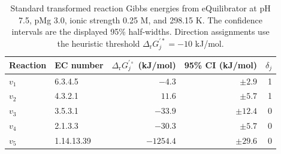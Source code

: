 \begin{table}[htbp]
  \centering
  \caption{Standard transformed reaction Gibbs energies from eQuilibrator at
    pH 7.5, pMg 3.0, ionic strength 0.25 M, and 298.15 K. The confidence
    intervals are the displayed 95\% half-widths. Direction assignments use
    the heuristic threshold
    $\Delta_{\mathrm r}G_j^{\prime *}=-10$ kJ/mol.}
  \label{tab:urea-thermodynamics}
  \begin{tabular}{llrrr}
    \toprule
    Reaction & EC number & $\Delta_{\mathrm r}G_j^{\prime\circ}$
      (kJ/mol) & 95\% CI (kJ/mol) & $\delta_j$ \\
    \midrule
    $v_1$ & 6.3.4.5   & $-4.3$    & $\pm 2.9$  & 1 \\
    $v_2$ & 4.3.2.1   & $11.6$    & $\pm 5.7$  & 1 \\
    $v_3$ & 3.5.3.1   & $-33.9$   & $\pm 12.4$ & 0 \\
    $v_4$ & 2.1.3.3   & $-30.3$   & $\pm 5.7$  & 0 \\
    $v_5$ & 1.14.13.39 & $-1254.4$ & $\pm 29.6$ & 0 \\
    \bottomrule
  \end{tabular}
\end{table}


